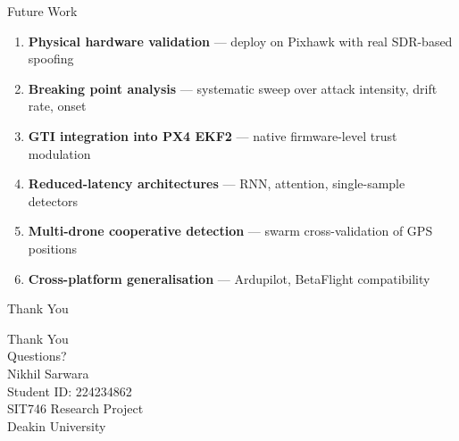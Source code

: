\documentclass[11pt]{beamer}
\begin{document}
\begin{frame}{Future Work}
\begin{enumerate}
    \item \textbf{Physical hardware validation} — deploy on Pixhawk with real SDR-based spoofing
    \item \textbf{Breaking point analysis} — systematic sweep over attack intensity, drift rate, onset
    \item \textbf{GTI integration into PX4 EKF2} — native firmware-level trust modulation
    \item \textbf{Reduced-latency architectures} — RNN, attention, single-sample detectors
    \item \textbf{Multi-drone cooperative detection} — swarm cross-validation of GPS positions
    \item \textbf{Cross-platform generalisation} — Ardupilot, BetaFlight compatibility
\end{enumerate}
\end{frame}

\begin{frame}{Thank You}
\begin{center}
\Huge Thank You\\[1cm]
\Large Questions?\\[1cm]
\large Nikhil Sarwara\\
Student ID: 224234862\\
SIT746 Research Project\\
Deakin University
\end{center}
\end{frame}

\end{document}
